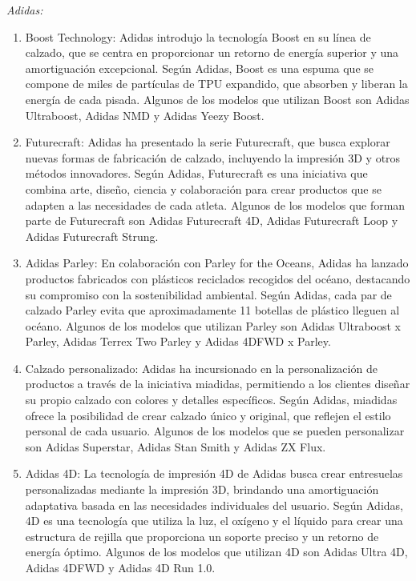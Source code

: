 \documentclass[a4paper,12pt]{article}
\begin{document}
\emph{Adidas:}
\begin{enumerate}
	\item Boost Technology: Adidas introdujo la tecnología Boost en su línea de calzado, que se centra en proporcionar un retorno de energía superior y una amortiguación excepcional. Según Adidas, Boost es una espuma que se compone de miles de partículas de TPU expandido, que absorben y liberan la energía de cada pisada. Algunos de los modelos que utilizan Boost son Adidas Ultraboost, Adidas NMD y Adidas Yeezy Boost.
	\item Futurecraft: Adidas ha presentado la serie Futurecraft, que busca explorar nuevas formas de fabricación de calzado, incluyendo la impresión 3D y otros métodos innovadores. Según Adidas, Futurecraft es una iniciativa que combina arte, diseño, ciencia y colaboración para crear productos que se adapten a las necesidades de cada atleta. Algunos de los modelos que forman parte de Futurecraft son Adidas Futurecraft 4D, Adidas Futurecraft Loop y Adidas Futurecraft Strung.
	\item Adidas Parley: En colaboración con Parley for the Oceans, Adidas ha lanzado productos fabricados con plásticos reciclados recogidos del océano, destacando su compromiso con la sostenibilidad ambiental. Según Adidas, cada par de calzado Parley evita que aproximadamente 11 botellas de plástico lleguen al océano. Algunos de los modelos que utilizan Parley son Adidas Ultraboost x Parley, Adidas Terrex Two Parley y Adidas 4DFWD x Parley.
	\item Calzado personalizado: Adidas ha incursionado en la personalización de productos a través de la iniciativa miadidas, permitiendo a los clientes diseñar su propio calzado con colores y detalles específicos. Según Adidas, miadidas ofrece la posibilidad de crear calzado único y original, que reflejen el estilo personal de cada usuario. Algunos de los modelos que se pueden personalizar son Adidas Superstar, Adidas Stan Smith y Adidas ZX Flux.
	\item Adidas 4D: La tecnología de impresión 4D de Adidas busca crear entresuelas personalizadas mediante la impresión 3D, brindando una amortiguación adaptativa basada en las necesidades individuales del usuario. Según Adidas, 4D es una tecnología que utiliza la luz, el oxígeno y el líquido para crear una estructura de rejilla que proporciona un soporte preciso y un retorno de energía óptimo. Algunos de los modelos que utilizan 4D son Adidas Ultra 4D, Adidas 4DFWD y Adidas 4D Run 1.0.

\end{enumerate}
\end{document}
